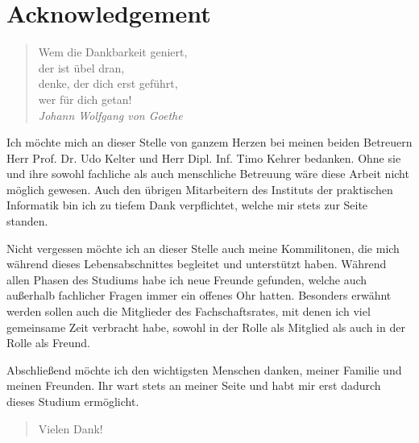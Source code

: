 \chapter*{Acknowledgement}\label{acknowledgement}
\begin{quote}
Wem die Dankbarkeit geniert,\\
der ist übel dran,\\
denke, der dich erst geführt,\\
wer für dich getan!\\
\textit{Johann Wolfgang von Goethe}
\end{quote}
\bigskip
Ich möchte mich an dieser Stelle von ganzem Herzen bei meinen beiden Betreuern
Herr Prof. Dr. Udo Kelter und Herr Dipl. Inf. Timo Kehrer bedanken. Ohne sie und
ihre sowohl fachliche als auch menschliche Betreuung wäre diese Arbeit nicht
möglich gewesen. Auch den übrigen Mitarbeitern des Instituts der praktischen
Informatik bin ich zu tiefem Dank verpflichtet, welche mir stets zur
Seite standen.

Nicht vergessen möchte ich an dieser Stelle auch meine Kommilitonen, die mich
während dieses Lebensabschnittes begleitet und unterstützt haben. Während allen
Phasen des Studiums habe ich neue Freunde gefunden, welche auch außerhalb
fachlicher Fragen immer ein offenes Ohr hatten. Besonders erwähnt werden sollen
auch die Mitglieder des Fachschaftsrates, mit denen ich viel gemeinsame Zeit
verbracht habe, sowohl in der Rolle als Mitglied als auch in der Rolle als Freund.

Abschließend möchte ich den wichtigsten Menschen danken, meiner Familie
und meinen Freunden. Ihr wart stets an meiner Seite und habt mir erst dadurch
dieses Studium ermöglicht.

\begin{quote}
Vielen Dank!
\end{quote}
 
